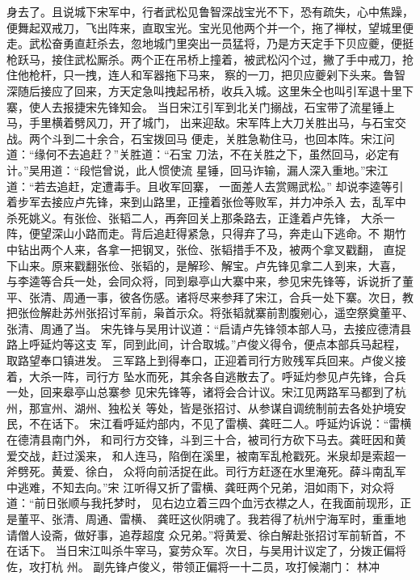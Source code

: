 身去了。且说城下宋军中，行者武松见鲁智深战宝光不下，恐有疏失，心中焦躁，
便舞起双戒刀，飞出阵来，直取宝光。宝光见他两个并一个，拖了禅杖，望城里便
走。武松奋勇直赶杀去，忽地城门里突出一员猛将，乃是方天定手下贝应夔，便挺
枪跃马，接住武松厮杀。两个正在吊桥上撞着，被武松闪个过，撇了手中戒刀，抢
住他枪杆，只一拽，连人和军器拖下马来，察的一刀，把贝应夔剁下头来。鲁智
深随后接应了回来，方天定急叫拽起吊桥，收兵入城。这里朱仝也叫引军退十里下
寨，使人去报捷宋先锋知会。
当日宋江引军到北关门搦战，石宝带了流星锤上马，手里横着劈风刀，开了城门，
出来迎敌。宋军阵上大刀关胜出马，与石宝交战。两个斗到二十余合，石宝拨回马
便走，关胜急勒住马，也回本阵。宋江问道：“缘何不去追赶？”关胜道：“石宝
刀法，不在关胜之下，虽然回马，必定有计。”吴用道：“段恺曾说，此人惯使流
星锤，回马诈输，漏人深入重地。”宋江道：“若去追赶，定遭毒手。且收军回寨，
一面差人去赏赐武松。”
却说李逵等引着步军去接应卢先锋，来到山路里，正撞着张俭等败军，并力冲杀入
去，乱军中杀死姚义。有张俭、张韬二人，再奔回关上那条路去，正逢着卢先锋，
大杀一阵，便望深山小路而走。背后追赶得紧急，只得弃了马，奔走山下逃命。不
期竹中钻出两个人来，各拿一把钢叉，张俭、张韬措手不及，被两个拿叉戳翻，
直捉下山来。原来戳翻张俭、张韬的，是解珍、解宝。卢先锋见拿二人到来，大喜，
与李逵等合兵一处，会同众将，同到皋亭山大寨中来，参见宋先锋等，诉说折了董
平、张清、周通一事，彼各伤感。诸将尽来参拜了宋江，合兵一处下寨。次日，教
把张俭解赴苏州张招讨军前，枭首示众。将张韬就寨前割腹剜心，遥空祭奠董平、
张清、周通了当。
宋先锋与吴用计议道：“启请卢先锋领本部人马，去接应德清县路上呼延灼等这支
军，同到此间，计合取城。”卢俊义得令，便点本部兵马起程，取路望奉口镇进发。
三军路上到得奉口，正迎着司行方败残军兵回来。卢俊义接着，大杀一阵，司行方
坠水而死，其余各自逃散去了。呼延灼参见卢先锋，合兵一处，回来皋亭山总寨参
见宋先锋等，诸将会合计议。宋江见两路军马都到了杭州，那宣州、湖州、独松关
等处，皆是张招讨、从参谋自调统制前去各处护境安民，不在话下。
宋江看呼延灼部内，不见了雷横、龚旺二人。呼延灼诉说：“雷横在德清县南门外，
和司行方交锋，斗到三十合，被司行方砍下马去。龚旺因和黄爱交战，赶过溪来，
和人连马，陷倒在溪里，被南军乱枪戳死。米泉却是索超一斧劈死。黄爱、徐白，
众将向前活捉在此。司行方赶逐在水里淹死。薛斗南乱军中逃难，不知去向。”宋
江听得又折了雷横、龚旺两个兄弟，泪如雨下，对众将道：“前日张顺与我托梦时，
见右边立着三四个血污衣襟之人，在我面前现形，正是董平、张清、周通、雷横、
龚旺这伙阴魂了。我若得了杭州宁海军时，重重地请僧人设斋，做好事，追荐超度
众兄弟。”将黄爱、徐白解赴张招讨军前斩首，不在话下。
当日宋江叫杀牛宰马，宴劳众军。次日，与吴用计议定了，分拨正偏将佐，攻打杭
州。
副先锋卢俊义，带领正偏将一十二员，攻打候潮门：
林冲

